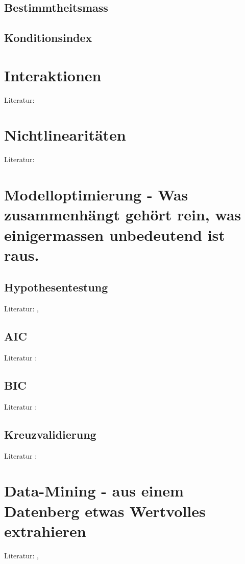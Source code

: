 \documentclass[english,12pt,doc]{apa}
\begin{document}
\subsection{Bestimmtheitsmass} 
\blindtext

\subsection{Konditionsindex}
\blindtext

\section{Interaktionen}
Literatur: 

\blindtext

\section{Nichtlinearitäten}
Literatur: 

\blindtext


\section{Modelloptimierung - Was zusammenhängt gehört rein, was einigermassen unbedeutend ist raus.}
\subsection{Hypothesentestung}
Literatur: , 

\blindtext
\subsection{AIC}
Literatur : 

\blindtext
\subsection{BIC}
Literatur : 

\blindtext
\subsection{Kreuzvalidierung}
Literatur : 

\blindtext

\section{Data-Mining - aus einem Datenberg etwas Wertvolles extrahieren}
Literatur: , 
\end{document}
